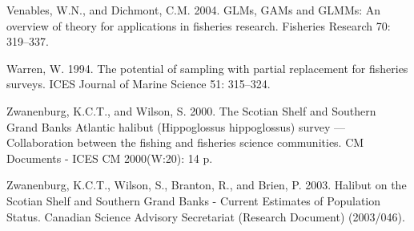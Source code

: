 \documentclass[12pt]{article}\usepackage[]{graphicx}\usepackage[]{color}
\begin{document}
\leavevmode\hypertarget{ref-Venables2004}{}%
Venables, W.N., and Dichmont, C.M. 2004. GLMs, GAMs and GLMMs: An overview of theory for applications in fisheries research. Fisheries Research 70: 319--337.

\leavevmode\hypertarget{ref-Warren1994}{}%
Warren, W. 1994. The potential of sampling with partial replacement for fisheries surveys. ICES Journal of Marine Science 51: 315--324.

\leavevmode\hypertarget{ref-Zwanenburg2000}{}%
Zwanenburg, K.C.T., and Wilson, S. 2000. The Scotian Shelf and Southern Grand Banks Atlantic halibut (Hippoglossus hippoglossus) survey --- Collaboration between the fishing and fisheries science communities. CM Documents - ICES CM 2000(W:20): 14 p.

\leavevmode\hypertarget{ref-Zwanenburg2003}{}%
Zwanenburg, K.C.T., Wilson, S., Branton, R., and Brien, P. 2003. Halibut on the Scotian Shelf and Southern Grand Banks - Current Estimates of Population Status. Canadian Science Advisory Secretariat (Research Document) (2003/046).
\end{document}
